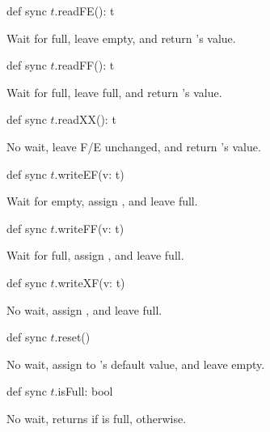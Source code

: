 \begin{protohead}
def sync $t$.readFE(): t
\end{protohead}
\begin{protobody}
Wait for full, leave empty, and return 's value.
\end{protobody}

\begin{protohead}
def sync $t$.readFF(): t
\end{protohead}
\begin{protobody}
Wait for full, leave full, and return 's value.
\end{protobody}

\begin{protohead}
def sync $t$.readXX(): t
\end{protohead}
\begin{protobody}
No wait, leave F/E unchanged, and return 's value.
\end{protobody}

\begin{protohead}
def sync $t$.writeEF(v: t)
\end{protohead}
\begin{protobody}
Wait for empty, assign , and leave full.
\end{protobody}

\begin{protohead}
def sync $t$.writeFF(v: t)
\end{protohead}
\begin{protobody}
Wait for full, assign , and leave full.
\end{protobody}

\begin{protohead}
def sync $t$.writeXF(v: t)
\end{protohead}
\begin{protobody}
No wait, assign , and leave full.
\end{protobody}

\begin{protohead}
def sync $t$.reset()
\end{protohead}
\begin{protobody}
No wait, assign to  's default value, and leave empty.
\end{protobody}

\begin{protohead}
def sync $t$.isFull: bool
\end{protohead}
\begin{protobody}
No wait, returns  if  is full,  otherwise.
\end{protobody}


